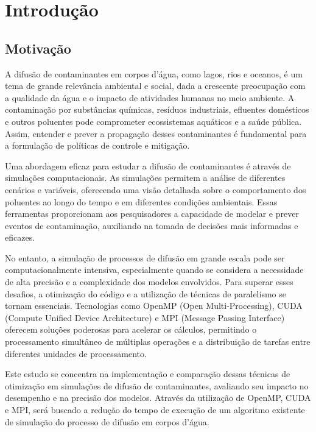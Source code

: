 \section{Introdução}

\subsection{Motivação} \label{sec:firstpage}

A difusão de contaminantes em corpos d'água, como lagos, rios e oceanos, é um tema de grande relevância ambiental e social, dada a crescente preocupação com a qualidade da água e o impacto de atividades humanas no meio ambiente. A contaminação por substâncias químicas, resíduos industriais, efluentes domésticos e outros poluentes pode comprometer ecossistemas aquáticos e a saúde pública. Assim, entender e prever a propagação desses contaminantes é fundamental para a formulação de políticas de controle e mitigação.

Uma abordagem eficaz para estudar a difusão de contaminantes é através de simulações computacionais. As simulações permitem a análise de diferentes cenários e variáveis, oferecendo uma visão detalhada sobre o comportamento dos poluentes ao longo do tempo e em diferentes condições ambientais. Essas ferramentas proporcionam aos pesquisadores a capacidade de modelar e prever eventos de contaminação, auxiliando na tomada de decisões mais informadas e eficazes.

No entanto, a simulação de processos de difusão em grande escala pode ser computacionalmente intensiva, especialmente quando se considera a necessidade de alta precisão e a complexidade dos modelos envolvidos. Para superar esses desafios, a otimização do código e a utilização de técnicas de paralelismo se tornam essenciais. Tecnologias como OpenMP (Open Multi-Processing), CUDA (Compute Unified Device Architecture) e MPI (Message Passing Interface) oferecem soluções poderosas para acelerar os cálculos, permitindo o processamento simultâneo de múltiplas operações e a distribuição de tarefas entre diferentes unidades de processamento.

Este estudo se concentra na implementação e comparação dessas técnicas de otimização em simulações de difusão de contaminantes, avaliando seu impacto no desempenho e na precisão dos modelos. Através da utilização de OpenMP, CUDA e MPI, será buscado a redução do tempo de execução de um algoritmo existente de simulação do processo de difusão em corpos d'água.

